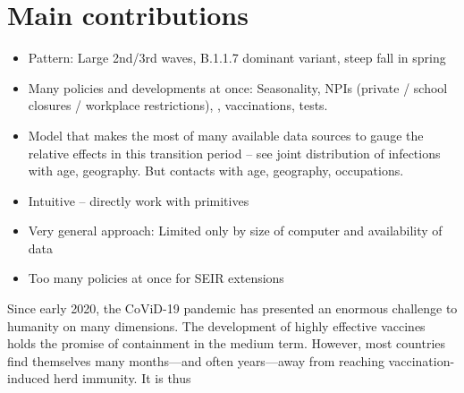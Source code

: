


\section{Main contributions}

\begin{itemize}
    \item Pattern: Large 2nd/3rd waves, B.1.1.7 dominant variant, steep fall in spring
    \item Many policies and developments at once: Seasonality, NPIs (private / school closures / workplace restrictions), , vaccinations, tests.
    \item Model that makes the most of many available data sources to gauge the relative effects in this transition period -- see joint distribution of infections with age, geography. But contacts with age, geography, occupations. 
    \item Intuitive -- directly work with primitives
    \item Very general approach: Limited only by size of computer and availability of data
    \item Too many policies at once for SEIR extensions
\end{itemize}




\clearpage

Since early 2020, the CoViD-19 pandemic has presented an enormous challenge to humanity on many dimensions. The development of highly effective vaccines holds the promise of containment in the medium term. However, most countries find themselves many months---and often years---away from reaching vaccination-induced herd immunity. It is thus 

